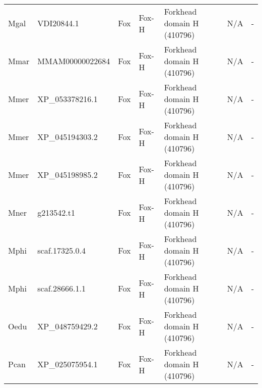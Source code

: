 \documentclass[../main.tex]{subfiles}
\begin{document}
\begin{landscape}
\begin{longtable}{lllllll}
		Mgal           & VDI20844.1            & Fox            & Fox-H               & Forkhead domain H (410796)                  & N/A                                                                    & -                    \\
		Mmar           & MMAM00000022684       & Fox            & Fox-H               & Forkhead domain H (410796)                  & N/A                                                                    & -                    \\
		Mmer           & XP\_053378216.1       & Fox            & Fox-H               & Forkhead domain H (410796)                  & N/A                                                                    & -                    \\
		Mmer           & XP\_045194303.2       & Fox            & Fox-H               & Forkhead domain H (410796)                  & N/A                                                                    & -                    \\
		Mmer           & XP\_045198985.2       & Fox            & Fox-H               & Forkhead domain H (410796)                  & N/A                                                                    & -                    \\
		Mner           & g213542.t1            & Fox            & Fox-H               & Forkhead domain H (410796)                  & N/A                                                                    & -                    \\
		Mphi           & scaf.17325.0.4        & Fox            & Fox-H               & Forkhead domain H (410796)                  & N/A                                                                    & -                    \\
		Mphi           & scaf.28666.1.1        & Fox            & Fox-H               & Forkhead domain H (410796)                  & N/A                                                                    & -                    \\
		Oedu           & XP\_048759429.2       & Fox            & Fox-H               & Forkhead domain H (410796)                  & N/A                                                                    & -                    \\
		Pcan           & XP\_025075954.1       & Fox            & Fox-H               & Forkhead domain H (410796)                  & N/A                                                                    & -                    \\

\end{longtable}
\end{landscape}
\end{document}
